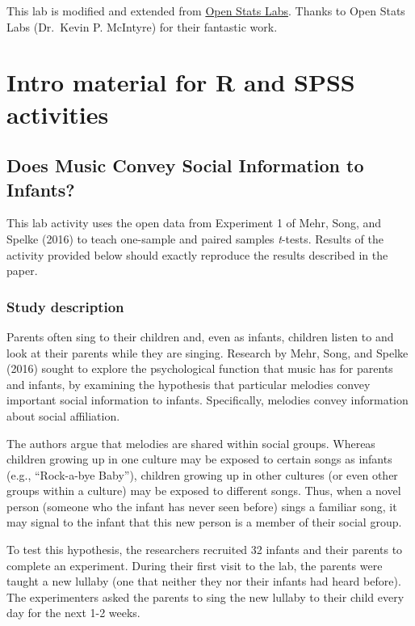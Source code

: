 \documentclass[
]{book}
\begin{document}
This lab is modified and extended from \href{https://sites.trinity.edu/osl}{Open Stats Labs}. Thanks to Open Stats Labs (Dr.~Kevin P. McIntyre) for their fantastic work.

\hypertarget{intro-material-for-r-and-spss-activities}{%
\section{Intro material for R and SPSS activities}\label{intro-material-for-r-and-spss-activities}}

\hypertarget{does-music-convey-social-information-to-infants}{%
\subsection{Does Music Convey Social Information to Infants?}\label{does-music-convey-social-information-to-infants}}

This lab activity uses the open data from Experiment 1 of Mehr, Song, and Spelke (2016) to teach one-sample and paired samples \emph{t}-tests. Results of the activity provided below should exactly reproduce the results described in the paper.

\hypertarget{study-description}{%
\subsubsection{Study description}\label{study-description}}

Parents often sing to their children and, even as infants, children listen to and look at their parents while they are singing. Research by Mehr, Song, and Spelke (2016) sought to explore the psychological function that music has for parents and infants, by examining the hypothesis that particular melodies convey important social information to infants. Specifically, melodies convey information about social affiliation.

The authors argue that melodies are shared within social groups. Whereas children growing up in one culture may be exposed to certain songs as infants (e.g., ``Rock-a-bye Baby''), children growing up in other cultures (or even other groups within a culture) may be exposed to different songs. Thus, when a novel person (someone who the infant has never seen before) sings a familiar song, it may signal to the infant that this new person is a member of their social group.

To test this hypothesis, the researchers recruited 32 infants and their parents to complete an experiment. During their first visit to the lab, the parents were taught a new lullaby (one that neither they nor their infants had heard before). The experimenters asked the parents to sing the new lullaby to their child every day for the next 1-2 weeks.
\end{document}
